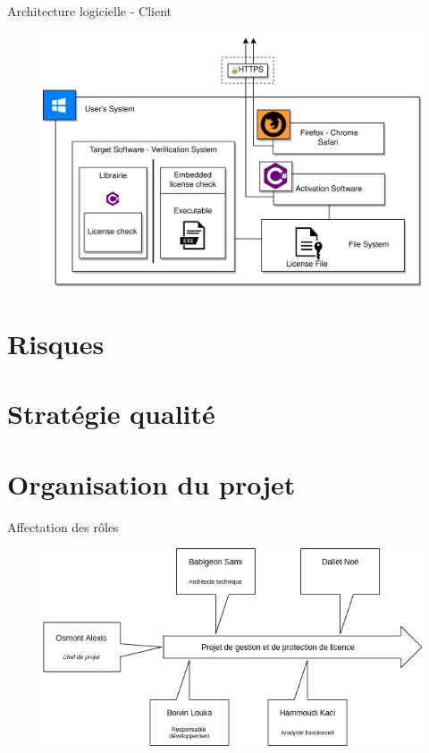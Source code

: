 \documentclass{cubeamer}
\begin{document}
\begin{frame}{Architecture logicielle - Client}
    \begin{figure}
        \centering
        \vspace{-0.8cm}
        \includegraphics[scale=0.72]{img/DAT-client.png}
    \end{figure}
\end{frame}

\section{Risques}

\section{Stratégie qualité} %

\section{Organisation du projet} %

\begin{frame}{Affectation des rôles}
    \begin{figure}
        \centering
        \includegraphics[scale=0.55]{img/schema_role_projet.png}
    \end{figure}
\end{frame}
\end{document}
